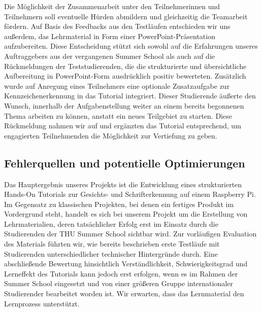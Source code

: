  Die Möglichkeit der Zusammenarbeit unter den Teilnehmerinnen und Teilnehmern soll eventuelle Hürden abmildern und gleichzeitig die Teamarbeit fördern.
Auf Basis des Feedbacks aus den Testläufen entschieden wir uns außerdem, das Lehrmaterial in Form einer PowerPoint-Präsentation aufzubereiten.
 Diese Entscheidung stützt sich sowohl auf die Erfahrungen unseres Auftraggebers aus der vergangenen Summer School als auch auf die Rückmeldungen der Teststudierenden, die die strukturierte und übersichtliche Aufbereitung in PowerPoint-Form ausdrücklich positiv bewerteten.\singlespacing
Zusätzlich wurde auf Anregung eines Teilnehmers eine optionale Zusatzaufgabe zur Kennzeichenerkennung in das Tutorial integriert.
 Dieser Studierende äußerte den Wunsch, innerhalb der Aufgabenstellung weiter an einem bereits begonnenen Thema arbeiten zu können, anstatt ein neues Teilgebiet zu starten.
 Diese Rückmeldung nahmen wir auf und ergänzten das Tutorial entsprechend, um engagierten Teilnehmenden die Möglichkeit zur Vertiefung zu geben.
\subsection{Fehlerquellen und potentielle Optimierungen}
Das Hauptergebnis unseres Projekts ist die Entwicklung eines strukturierten Hands-On Tutorials zur Gesichts- und Schrifterkennung auf einem Raspberry Pi. 
Im Gegensatz zu klassischen Projekten, bei denen ein fertiges Produkt im Vordergrund steht, handelt es sich bei unserem Projekt um die Erstellung von Lehrmaterialien, deren tatsächlicher Erfolg erst im Einsatz durch die Studierenden der THU Summer School sichtbar wird. Zur vorläufigen Evaluation des Materials führten wir, wie bereits beschrieben erste Testläufe mit Studierenden unterschiedlicher technischer Hintergründe durch. Eine abschließende Bewertung hinsichtlich Verständlichkeit, Schwierigkeitsgrad und Lerneffekt des Tutorials kann jedoch erst erfolgen, wenn es im Rahmen der Summer School eingesetzt und von einer größeren Gruppe internationaler Studierender bearbeitet worden ist. Wir erwarten, dass das Lernmaterial den Lernprozess unterstützt. 
 